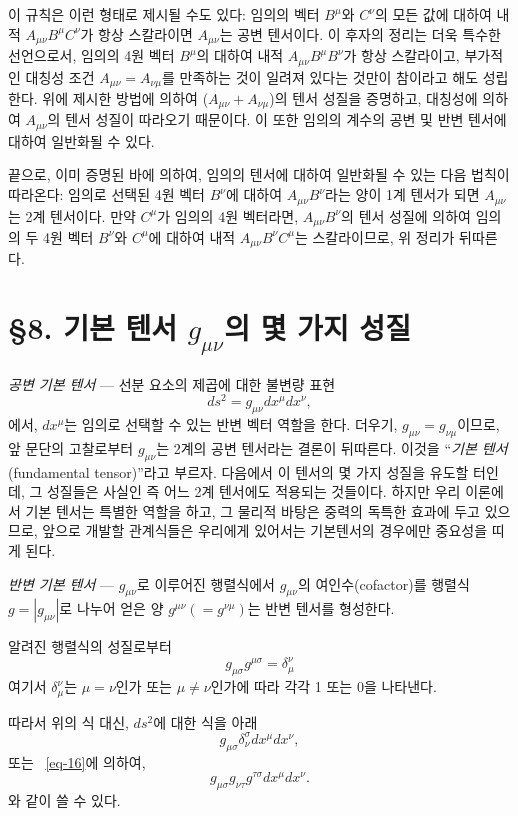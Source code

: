 \documentclass[b5paper]{article}
\begin{document}
이 규칙은 이런 형태로 제시될 수도 있다: 
임의의 벡터 $B^{\mu}$와 $C^\nu$의 모든 값에 대하여 내적 $A_{\mu\nu} B^\mu C^\nu$가 항상 스칼라이면 $A_{\mu\nu}$는 공변 텐서이다. 이 후자의 정리는 더욱 특수한 선언으로서, 임의의 4원 벡터 $B^\mu$의 대하여 내적 $A_{\mu\nu} B^\mu B^\nu$가 항상 스칼라이고, 부가적인 대칭성 조건 $A_{\mu\nu}=A_{\nu\mu}$를 만족하는 것이 일려져 있다는 것만이 참이라고 해도 성립한다. 위에 제시한 방법에 의하여 ($A_{\mu\nu}+A_{\nu\mu}$)의 텐서 성질을 증명하고, 대칭성에 의하여 $A_{\mu\nu}$의 텐서 성질이 따라오기 때문이다. 이 또한 임의의 계수의 공변 및 반변 텐서에 대하여 일반화될 수 있다.

끝으로, 이미 증명된 바에 의하여, 임의의 텐서에 대하여 일반화될 수 있는 다음 법칙이 따라온다: 임의로 선택된 4원 벡터 $B^\nu$에 대하여 $A_{\mu\nu} B^\nu$라는 양이 1계 텐서가 되면 $A_{\mu\nu}$는 2계 텐서이다. 만약 $C^\mu$가 임의의 4원 벡터라면, $A_{\mu\nu} B^\nu$의 텐서 성질에 의하여 임의의 두 4원 벡터 $B^\nu$와 $C^\mu$에 대하여 내적 $A_{\mu\nu} B^\nu C^\mu$는 스칼라이므로, 위 정리가 뒤따른다. 

\section*{\S 8. 기본 텐서 $g_{\mu\nu}$의 몇 가지 성질}
\emph{공변 기본 텐서} --- 
선분 요소의 제곱에 대한 불변량 표현 
\[ds^2 = g_{\mu\nu}dx^\mu dx^\nu ,\]
에서, $dx^\mu$는 임의로 선택할 수 있는 반변 벡터 역할을 한다. 더우기, $g_{\mu\nu}=g_{\nu\mu}$이므로, 앞 문단의 고찰로부터 $g_{\mu\nu}$는 2계의 공변 텐서라는 결론이 뒤따른다.  이것을 ``\emph{기본 텐서}(fundamental tensor)''라고 부르자. 다음에서 이 텐서의 몇 가지 성질을 유도할 터인데, 그 성질들은 사실인 즉 어느 2계 텐서에도 적용되는 것들이다. 하지만 우리 이론에서 기본 텐서는 특별한 역할을 하고, 그 물리적 바탕은 중력의 독특한 효과에 두고 있으므로, 앞으로 개발할 관계식들은 우리에게 있어서는 기본텐서의 경우에만 중요성을 띠게 된다.

\emph{반변 기본 텐서} --- 
$g_{\mu\nu}$로 이루어진 행렬식에서 $g_{\mu\nu}$의 여인수(cofactor)를 행렬식 $g=\left|g_{\mu\nu}\right|$로 나누어 얻은 양 $g^{\mu\nu}(=g^{\nu\mu})$는 반변 텐서를 형성한다.\par
알려진 행렬식의 성질로부터
\begin{equation} \label{eq-16}
	g_{\mu\sigma} g^{\mu\sigma} = \delta_\mu^\nu
\end{equation}
여기서 $\delta_\mu^\nu$는 $\mu=\nu$인가 또는 $\mu\ne\nu$인가에 따라 각각 1 또는 0을 나타낸다.

따라서 위의 식 대신, $ds^2$에 대한 식을 아래
\[g_{\mu\sigma}\delta_\nu^\sigma dx^\mu dx^\nu ,\]
또는 ~\eqref{eq-16}에 의하여,
\[g_{\mu\sigma} g_{\nu\tau} g^{\tau\sigma} dx^\mu dx^\nu .\]
와 같이 쓸 수 있다.
\end{document}

